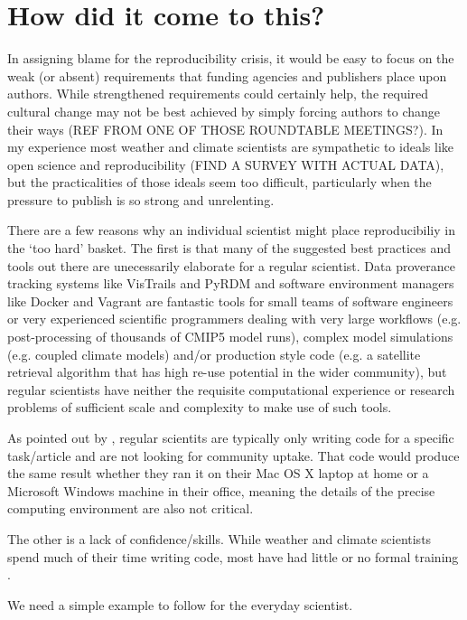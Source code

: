 \section{How did it come to this?}

In assigning blame for the reproducibility crisis, it would be easy to focus on the weak (or absent) requirements that funding agencies and publishers place upon authors. While strengthened requirements could certainly help, the required cultural change may not be best achieved by simply forcing authors to change their ways (REF FROM ONE OF THOSE ROUNDTABLE MEETINGS?). In my experience most weather and climate scientists are sympathetic to ideals like open science and reproducibility (FIND A SURVEY WITH ACTUAL DATA), but the practicalities of those ideals seem too difficult, particularly when the pressure to publish is so strong and unrelenting. 

There are a few reasons why an individual scientist might place reproducibiliy in the `too hard' basket. The first is that many of the suggested best practices and tools out there are unecessarily elaborate for a regular scientist. Data proverance tracking systems like VisTrails \citep{Freire2012} and PyRDM \citep{Jacobs2014} and software environment managers like Docker and Vagrant \citep{Stodden2014} are fantastic tools for small teams of software engineers or very experienced scientific programmers dealing with very large workflows (e.g. post-processing of thousands of CMIP5 model runs), complex model simulations (e.g. coupled climate models) and/or production style code (e.g. a satellite retrieval algorithm that has high re-use potential in the wider community), but regular scientists have neither the requisite computational experience or research problems of sufficient scale and complexity to make use of such tools.      

As pointed out by \citet{Easterbrook2014}, regular scientits are typically only writing code for a specific task/article and are not looking for community uptake. That code would produce the same result whether they ran it on their Mac OS X laptop at home or a Microsoft Windows machine in their office, meaning the details of the precise computing environment are also not critical.

The other is a lack of confidence/skills. While weather and climate scientists spend much of their time writing code, most have had little or no formal training \citet{Hannay2009}.   


We need a simple example to follow for the everyday scientist.
